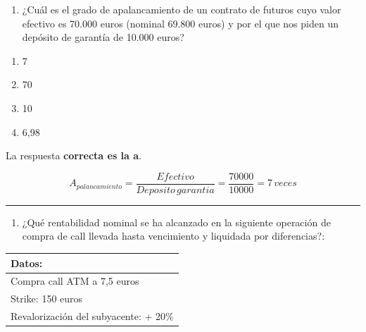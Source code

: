 \documentclass[
  letterpaper,
  DIV=11,
  numbers=noendperiod]{scrreprt}
\providecommand{\tightlist}{%
  \setlength{\itemsep}{0pt}\setlength{\parskip}{0pt}}\usepackage{longtable,booktabs,array}
\begin{document}
\begin{enumerate}
\def\labelenumi{\arabic{enumi}.}
\setcounter{enumi}{54}
\tightlist
\item
  ¿Cuál es el grado de apalancamiento de un contrato de futuros cuyo
  valor efectivo es 70.000 euros (nominal 69.800 euros) y por el que nos
  piden un depósito de garantía de 10.000 euros?
\end{enumerate}

\begin{enumerate}
\def\labelenumi{\alph{enumi})}
\item
  7
\item
  70
\item
  10
\item
  6,98
\end{enumerate}

\begin{tcolorbox}[enhanced jigsaw, left=2mm, opacityback=0, colback=white, breakable, arc=.35mm, bottomrule=.15mm, rightrule=.15mm, toprule=.15mm, leftrule=.75mm, colframe=quarto-callout-tip-color-frame]
\begin{minipage}[t]{5.5mm}
\textcolor{quarto-callout-tip-color}{\faLightbulb}
\end{minipage}%
\begin{minipage}[t]{\textwidth - 5.5mm}

La respuesta \textbf{correcta es la a}.

\[A_{palancamiento}=\frac{Efectivo}{Deposito\,garantia}=\frac{70000}{10000}=7\,veces\]

\end{minipage}%
\end{tcolorbox}

\begin{center}\rule{0.5\linewidth}{0.5pt}\end{center}

\begin{enumerate}
\def\labelenumi{\arabic{enumi}.}
\setcounter{enumi}{55}
\tightlist
\item
  ¿Qué rentabilidad nominal se ha alcanzado en la siguiente operación de
  compra de call llevada hasta vencimiento y liquidada por diferencias?:
\end{enumerate}

\begin{longtable}[]{@{}l@{}}
\toprule()
\textbf{Datos:} \\
\midrule()
\endhead
Compra call ATM a 7,5 euros \\
Strike: 150 euros \\
Revalorización del subyacente: + 20\% \\
\bottomrule()
\end{longtable}
\end{document}
